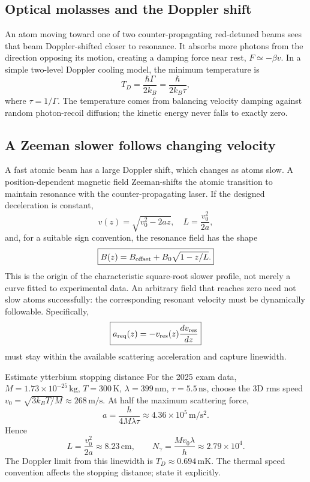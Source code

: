 \subsection{Optical molasses and the Doppler shift}
An atom moving toward one of two
counter-propagating red-detuned beams
sees that beam Doppler-shifted
closer to resonance. It absorbs
more photons from the direction
opposing its motion, creating a
damping force near rest,
\(F\simeq-\beta v\).
In a simple two-level Doppler
cooling model, the minimum temperature is
\[
\boxed{T_D=\frac{\hbar\Gamma}{2k_B}
=\frac{\hbar}{2k_B\tau}},
\]
where \(\tau=1/\Gamma\).
The temperature comes from balancing
velocity damping against random
photon-recoil diffusion; the kinetic
energy never falls to exactly zero.

\subsection{A Zeeman slower follows changing velocity}
A fast atomic beam has a large Doppler
shift, which changes as atoms slow.
A position-dependent magnetic field
Zeeman-shifts the atomic transition
to maintain resonance with the
counter-propagating laser.
If the designed deceleration is constant,
\[
v(z)=\sqrt{v_0^2-2az},
\quad L=\frac{v_0^2}{2a},
\]
and, for a suitable sign convention,
the resonance field has the shape
\[
\boxed{B(z)=B_{\rm offset}
+B_0\sqrt{1-z/L}.}
\]
This is the origin of the characteristic
square-root slower profile, not merely
a curve fitted to experimental data.
An arbitrary field that reaches zero
need not slow atoms successfully:
the corresponding resonant velocity
must be dynamically followable.
Specifically,
\[
\boxed{a_{\rm req}(z)=
-v_{\rm res}(z)\frac{dv_{\rm res}}{dz}}
\]
must stay within the available scattering
acceleration and capture linewidth.

\begin{worked}{Estimate ytterbium stopping distance}
For the 2025 exam data,
\(M=1.73\times10^{-25}\,\mathrm{kg}\),
\(T=300\,\mathrm{K}\),
\(\lambda=399\,\mathrm{nm}\),
\(\tau=5.5\,\mathrm{ns}\),
choose the 3D rms speed
\(v_0=\sqrt{3k_BT/M}\approx268\,\mathrm{m/s}\).
At half the maximum scattering force,
\[
a=\frac{h}{4M\lambda\tau}
\approx4.36\times10^5\,\mathrm{m/s^2}.
\]
Hence
\[
L=\frac{v_0^2}{2a}\approx8.23\,\mathrm{cm},
\qquad
N_\gamma=\frac{Mv_0\lambda}{h}
\approx2.79\times10^4.
\]
The Doppler limit from this linewidth
is \(T_D\approx0.694\,\mathrm{mK}\).
The thermal speed convention affects
the stopping distance; state it explicitly.
\end{worked}

